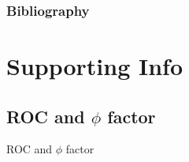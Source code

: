 \documentclass{beamer}
\begin{document}
\begin{frame}{}



\end{frame}

\begin{frame}[t,allowframebreaks]
\frametitle{Bibliography}
\printbibliography
\end{frame}


\section{Supporting Info}

\subsection{ROC and $\phi$ factor}
\begin{frame}{}
\begin{center}
{\Huge ROC and $\phi$ factor}
\end{center}
\end{frame}
\end{document}
